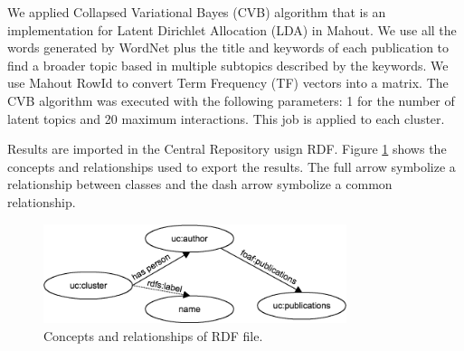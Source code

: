 \documentclass[11pt]{article}
\begin{document}
We applied Collapsed Variational Bayes (CVB) algorithm \cite{Blei} that is an implementation for Latent Dirichlet Allocation (LDA) in Mahout. We use all the words generated by WordNet plus the title and keywords of each publication to find a broader topic based in multiple subtopics described by the keywords. We use Mahout RowId to convert Term Frequency (TF) vectors into a matrix. The CVB algorithm was executed with the following parameters: 1 for the number of latent topics and 20 maximum interactions. This job is applied to each cluster.

Results are imported in the Central Repository usign RDF. Figure \ref{fig:descriptionrdf} shows the concepts and relationships used to export the results. The full arrow symbolize a relationship between classes and the dash arrow symbolize a common relationship.

\begin{figure}[ht!]
	\centering
		\includegraphics[height=2.9cm]{anotacion.png}
	\caption{Concepts and relationships of RDF file.}
	\label{fig:descriptionrdf}
\end{figure}



\end{document}
